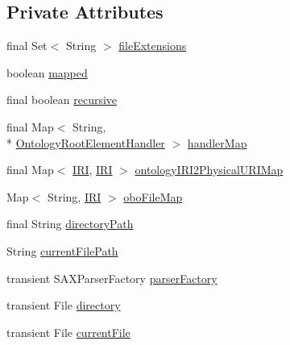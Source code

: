 \subsection*{Private Attributes}
\begin{DoxyCompactItemize}
\item 
final Set$<$ String $>$ \hyperlink{classorg_1_1semanticweb_1_1owlapi_1_1util_1_1_auto_i_r_i_mapper_af16ee74b99e250a7d77efa30cc04f5ef}{file\-Extensions}
\item 
boolean \hyperlink{classorg_1_1semanticweb_1_1owlapi_1_1util_1_1_auto_i_r_i_mapper_a856cad2d5b2f229fe924d7e7895ed1f9}{mapped}
\item 
final boolean \hyperlink{classorg_1_1semanticweb_1_1owlapi_1_1util_1_1_auto_i_r_i_mapper_a031ceaf910799a4c2be7be3b4f5e8cbe}{recursive}
\item 
final Map$<$ String, \\*
\hyperlink{interfaceorg_1_1semanticweb_1_1owlapi_1_1util_1_1_auto_i_r_i_mapper_1_1_ontology_root_element_handler}{Ontology\-Root\-Element\-Handler} $>$ \hyperlink{classorg_1_1semanticweb_1_1owlapi_1_1util_1_1_auto_i_r_i_mapper_a93513e7064f71208bb443af64144d9fb}{handler\-Map}
\item 
final Map$<$ \hyperlink{classorg_1_1semanticweb_1_1owlapi_1_1model_1_1_i_r_i}{I\-R\-I}, \hyperlink{classorg_1_1semanticweb_1_1owlapi_1_1model_1_1_i_r_i}{I\-R\-I} $>$ \hyperlink{classorg_1_1semanticweb_1_1owlapi_1_1util_1_1_auto_i_r_i_mapper_a3fe62de41b86b546cef101ddbfbfd997}{ontology\-I\-R\-I2\-Physical\-U\-R\-I\-Map}
\item 
Map$<$ String, \hyperlink{classorg_1_1semanticweb_1_1owlapi_1_1model_1_1_i_r_i}{I\-R\-I} $>$ \hyperlink{classorg_1_1semanticweb_1_1owlapi_1_1util_1_1_auto_i_r_i_mapper_a255593bbfe36d3a3f9ee3fe8890acf8d}{obo\-File\-Map}
\item 
final String \hyperlink{classorg_1_1semanticweb_1_1owlapi_1_1util_1_1_auto_i_r_i_mapper_a30053a8eab0ad1fb093ccc42933146e5}{directory\-Path}
\item 
String \hyperlink{classorg_1_1semanticweb_1_1owlapi_1_1util_1_1_auto_i_r_i_mapper_a2cba84315ffeb1470a2ee4bee8934343}{current\-File\-Path}
\item 
transient S\-A\-X\-Parser\-Factory \hyperlink{classorg_1_1semanticweb_1_1owlapi_1_1util_1_1_auto_i_r_i_mapper_a5ba23ae9c4421cdd609f17cc30d8813f}{parser\-Factory}
\item 
transient File \hyperlink{classorg_1_1semanticweb_1_1owlapi_1_1util_1_1_auto_i_r_i_mapper_afbf962708a720e77934fdafad8d4a432}{directory}
\item 
transient File \hyperlink{classorg_1_1semanticweb_1_1owlapi_1_1util_1_1_auto_i_r_i_mapper_acf1ca748c80a0491956c11f5252973d1}{current\-File}
\end{DoxyCompactItemize}
